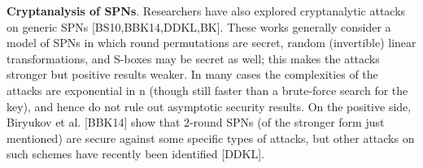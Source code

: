 {\bf Cryptanalysis of SPNs}. Researchers have also explored cryptanalytic attacks
on generic SPNs [BS10,BBK14,DDKL,BK]. These works generally consider a
model of SPNs in which round permutations are secret, random (invertible) linear
transformations, and S-boxes may be secret as well; this makes the attacks
stronger but positive results weaker. In many cases the complexities of the
attacks are exponential in n (though still faster than a brute-force search for
the key), and hence do not rule out asymptotic security results. On the positive
side, Biryukov et al. [BBK14] show that 2-round SPNs (of the stronger form just
mentioned) are secure against some specific types of attacks, but other attacks
on such schemes have recently been identified [DDKL].








